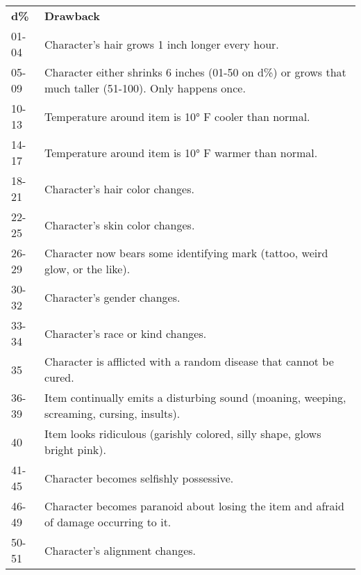 \begin{tabularx}{\linewidth}{lX}
\textbf{d\%} & \textbf{Drawback}                                                                                       \\
01-04        & Character's hair grows 1 inch longer every hour.                                                        \\
05-09        & Character either shrinks 6 inches (01-50 on d\%) or grows that much taller (51-100). Only happens once. \\
10-13        & Temperature around item is 10° F cooler than normal.                                                    \\
14-17        & Temperature around item is 10° F warmer than normal.                                                    \\
18-21        & Character's hair color changes.                                                                         \\
22-25        & Character's skin color changes.                                                                         \\
26-29        & Character now bears some identifying mark (tattoo, weird glow, or the like).                            \\
30-32        & Character's gender changes.                                                                             \\
33-34        & Character's race or kind changes.                                                                       \\
35           & Character is afflicted with a random disease that cannot be cured.                                      \\
36-39        & Item continually emits a disturbing sound (moaning, weeping, screaming, cursing, insults).              \\
40           & Item looks ridiculous (garishly colored, silly shape, glows bright pink).                               \\
41-45        & Character becomes selfishly possessive.                                                                 \\
46-49        & Character becomes paranoid about losing the item and afraid of damage occurring to it.                  \\
50-51        & Character's alignment changes.                                                                          \\

\end{tabularx}
